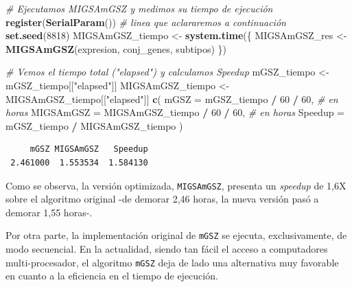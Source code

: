 \documentclass[12pt,twoside]{reedthesis}
\newenvironment{Shaded}{\begin{snugshade}}{\end{snugshade}}
\newcommand{\CommentTok}[1]{\textcolor[rgb]{0.56,0.35,0.01}{\textit{#1}}}
\newcommand{\DataTypeTok}[1]{\textcolor[rgb]{0.13,0.29,0.53}{#1}}
\newcommand{\DecValTok}[1]{\textcolor[rgb]{0.00,0.00,0.81}{#1}}
\newcommand{\KeywordTok}[1]{\textcolor[rgb]{0.13,0.29,0.53}{\textbf{#1}}}
\newcommand{\NormalTok}[1]{#1}
\newcommand{\OperatorTok}[1]{\textcolor[rgb]{0.81,0.36,0.00}{\textbf{#1}}}
\newcommand{\StringTok}[1]{\textcolor[rgb]{0.31,0.60,0.02}{#1}}
\begin{document}
\begin{Shaded}
\begin{Highlighting}[]
\CommentTok{# Ejecutamos MIGSAmGSZ y medimos su tiempo de ejecución}
\KeywordTok{register}\NormalTok{(}\KeywordTok{SerialParam}\NormalTok{()) }\CommentTok{# linea que aclararemos a continuación}
\KeywordTok{set.seed}\NormalTok{(}\DecValTok{8818}\NormalTok{)}
\NormalTok{MIGSAmGSZ_tiempo <-}\StringTok{ }\KeywordTok{system.time}\NormalTok{(\{}
\NormalTok{  MIGSAmGSZ_res <-}\StringTok{ }\KeywordTok{MIGSAmGSZ}\NormalTok{(expresion, conj_genes, subtipos)}
\NormalTok{\})}
\end{Highlighting}
\end{Shaded}
\begin{Shaded}
\begin{Highlighting}[]
\CommentTok{# Vemos el tiempo total ("elapsed") y calculamos Speedup}
\NormalTok{mGSZ_tiempo <-}\StringTok{ }\NormalTok{mGSZ_tiempo[[}\StringTok{"elapsed"}\NormalTok{]]}
\NormalTok{MIGSAmGSZ_tiempo <-}\StringTok{ }\NormalTok{MIGSAmGSZ_tiempo[[}\StringTok{"elapsed"}\NormalTok{]]}
\KeywordTok{c}\NormalTok{(}
  \DataTypeTok{mGSZ =}\NormalTok{ mGSZ_tiempo }\OperatorTok{/}\StringTok{ }\DecValTok{60} \OperatorTok{/}\StringTok{ }\DecValTok{60}\NormalTok{,            }\CommentTok{# en horas}
  \DataTypeTok{MIGSAmGSZ =}\NormalTok{ MIGSAmGSZ_tiempo }\OperatorTok{/}\StringTok{ }\DecValTok{60} \OperatorTok{/}\StringTok{ }\DecValTok{60}\NormalTok{,  }\CommentTok{# en horas}
  \DataTypeTok{Speedup =}\NormalTok{ mGSZ_tiempo }\OperatorTok{/}\StringTok{ }\NormalTok{MIGSAmGSZ_tiempo}
\NormalTok{)}
\end{Highlighting}
\end{Shaded}
\begin{verbatim}
     mGSZ MIGSAmGSZ   Speedup 
 2.461000  1.553534  1.584130 
\end{verbatim}
Como se observa, la versión optimizada, \texttt{MIGSAmGSZ}, presenta un \emph{speedup} de 1,6X sobre el algoritmo original -de demorar 2,46 horas, la nueva versión pasó a demorar 1,55 horas-.

\par

Por otra parte, la implementación original de \texttt{mGSZ} se ejecuta, exclusivamente, de modo secuencial. En la actualidad, siendo tan fácil el acceso a computadores multi-procesador, el algoritmo \texttt{mGSZ} deja de lado una alternativa muy favorable en cuanto a la eficiencia en el tiempo de ejecución.

\par
\end{document}
